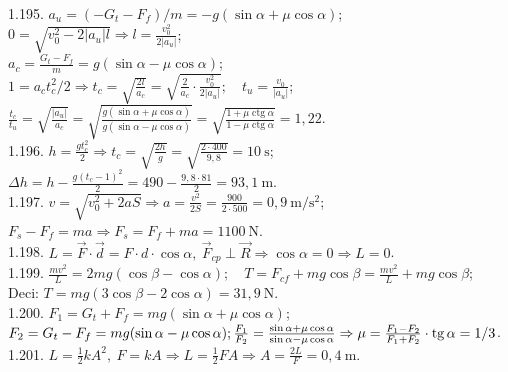 1.195. $a_{u}=\left(-G_{t}-F_{f}\right) / m=-g(\sin \alpha+\mu \cos \alpha)$;\\ $0=\sqrt{v_{0}^{2}-2\left|a_{u}\right| l} \Rightarrow l=\frac{v_{0}^{2}}{2\left|a_{u}\right|}$;\\ $a_{c}=\frac{G_{t}-F_{f}}{m}=g(\sin \alpha-\mu \cos \alpha)$;\\ $1=a_{c} t_{c}^{2} / 2 \Rightarrow t_{c}=\sqrt{\frac{2 l}{a_{c}}}=\sqrt{\frac{2}{a_{c}} \cdot \frac{v_{0}^{2}}{2\left|a_{u}\right|}}; \quad t_{u}=\frac{v_{0}}{\left|a_{u}\right|}$;\\ $\frac{t_{c}}{t_{u}}=\sqrt{\frac{\left|a_{u}\right|}{a_{c}}}=\sqrt{\frac{g(\sin \alpha+\mu \cos \alpha)}{g(\sin \alpha-\mu \cos \alpha)}}=\sqrt{\frac{1+\mu \operatorname{ctg} \alpha}{1-\mu \operatorname{ctg} \alpha}}=1,22$.\\

1.196. $h=\frac{g t_{c}^{2}}{2} \Rightarrow t_{c}=\sqrt{\frac{2 h}{g}}=\sqrt{\frac{2 \cdot 400}{9,8}}=10 \mathrm{~s}$;\\ $\Delta h=h-\frac{g\left(t_{c}-1\right)^{2}}{2}=490-\frac{9,8 \cdot 81}{2}=93,1 \mathrm{~m}$.\\

1.197. $v=\sqrt{v_{0}^{2}+2 a S} \Rightarrow a=\frac{v^{2}}{2 S}=\frac{900}{2 \cdot 500}=0,9 \mathrm{~m} / \mathrm{s}^{2}$;\\ $F_{s}-F_{f}=m a \Rightarrow F_{s}=F_{f}+m a=1100 \mathrm{~N}$.\\

1.198. $L=\vec{F} \cdot \vec{d}=F \cdot d \cdot \cos \alpha,\ \vec{F}_{c p} \perp \vec{R} \Rightarrow \cos \alpha=0 \Rightarrow L=0$.\\

1.199. $\frac{m v^{2}}{L}=2 m g(\cos \beta-\cos \alpha); \quad T=F_{c f}+m g \cos \beta=\frac{m v^{2}}{L}+m g \cos \beta$;\\ Deci: $T=m g(3 \cos \beta-2 \cos \alpha)=31,9 \mathrm{~N}$.\\

1.200. $F_{1}=G_{t}+F_{f}=m g(\sin \alpha+\mu \cos \alpha)$;\\ $F_{2}=G_{t}-F_{f}=m g(\sin \alpha-\mu \cos \alpha);\\ \frac{F_{1}}{F_{2}}=\frac{\sin \alpha+\mu \cos \alpha}{\sin \alpha-\mu \cos \alpha} \Rightarrow \mu=\frac{F_{1}-F_{2}}{F_{1}+F_{2}} \cdot \operatorname{tg} \alpha=1 / 3$.\\

1.201. $L=\frac{1}{2} k A^{2},\ F=k A \Rightarrow L=\frac{1}{2} F A \Rightarrow A=\frac{2 L}{F}=0,4 \mathrm{~m}$.\\

